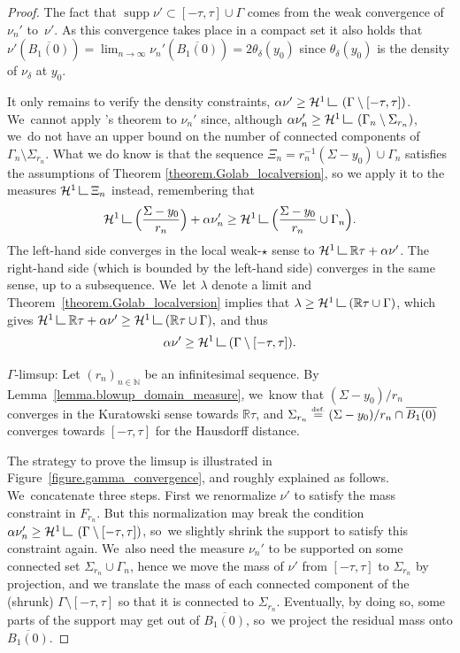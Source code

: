 \documentclass[JEP,XML,SOM,Unicode,NoFloatCountersInSection,published]{cedram}
\theoremstyle{definition}
\newcommand{\eqdef}{\ensuremath{\stackrel{\mbox{\upshape\tiny def.}}{=}}}
\newcommand\LM[1]{\hbox{\vrule width.5pt \vbox to#1pt{\vfill \hrule width#1pt height.5pt}}}
\newcommand\LL{{\mathchoice {\>\LM7\>}{\>\LM7\>}{\,\LM5\,}{\,\LM{3.35}\,}}}
\newcommand{\mres}{\LL}
\newcommand\cH{\mathcal{H}}
\newcommand{\RR}{\mathbb{R}}
\DeclareMathOperator{\supp}{supp}
\begin{document}
\begin{proof}
The fact that $\supp\nu' \subset [-\tau, \tau]\cup \Gamma$ comes from the weak convergence of~$\nu_{n}'$ to~$\nu'$. As this convergence takes place in a compact set it also holds that $\nu'(\overline{B_1(0)}) = \lim_{n \to \infty} \nu_{n}'(\overline{B_1(0)}) = 2\theta_\delta(y_0)$ since $\theta_\delta(y_0)$ is the density of $\nu_\delta$ at $y_0$.

It only remains to verify the density constraints, $\alpha \nu' \ge \mathcal{H}^1\mres \left(\Gamma\setminus [-\tau,\tau]\right)$. We~cannot apply \Golab's theorem to $\nu_n'$ since, although $\alpha\nu_n' \ge \cH^1\mres \left( \Gamma_n\setminus \Sigma_{r_n}\right)$, we~do not have an upper bound on the number of connected components of $\Gamma_n\setminus \Sigma_{r_n}$. What we do know is that the sequence $\Xi_n = r_n^{-1}(\Sigma - y_0) \cup \Gamma_n$ satisfies the assumptions of Theorem \ref{theorem.Golab_localversion},
so we apply it to the measures $\cH^1\mres\Xi_n$ instead, remembering that
\begin{equation*}
\mathcal{H}^1\mres
\Bigl(
\frac{\Sigma - y_0}{r_n}
\Bigr)
+
\alpha\nu_n'
\ge
\mathcal{H}^1\mres
\Bigl(
\frac{\Sigma - y_0}{r_n}\cup\Gamma_n
\Bigl).
\end{equation*}
The left-hand side converges in the local weak-$\star$ sense to
$\cH^1\mres \RR\tau + \alpha\nu'$. The right-hand side
(which is bounded by the left-hand side)
converges in the same sense, up to a subsequence. We~let
$\lambda$ denote a limit and Theorem~\ref{theorem.Golab_localversion} implies that $\lambda \ge \cH^1\mres (\RR\tau\cup \Gamma)$, which gives
$
\cH^1\mres \RR\tau + \alpha\nu' \ge \cH^1\mres (\RR\tau\cup \Gamma),
$
and thus
\[
\alpha\nu' \ge \cH^1\mres(\Gamma\setminus [-\tau,\tau]).
\]

\par $\Gamma$-limsup: Let $(r_{n})_{n\in\mathbb{N}}$ be an infinitesimal sequence. By Lemma~\ref{lemma.blowup_domain_measure}, we~know that $(\Sigma-y_0)/r_{n}$ converges in the Kuratowski sense towards $\RR\tau$, and $\Sigma_{r_n}\eqdef (\Sigma-\nobreak y_0)/r_{n}\cap\nobreak\overline{B_1(0)}$ converges towards $[-\tau,\tau]$ for the Hausdorff distance.

The strategy to prove the limsup is illustrated in Figure~\ref{figure.gamma_convergence},
and roughly explained as follows. We~concatenate three steps. First we renormalize $\nu'$ to satisfy the mass constraint in $F_{r_{n}}$. But this normalization may break the condition $\alpha \nu_n'\ge \cH^1\mres \left(\Gamma\setminus [-\tau,\tau]\right)$, so~we slightly shrink the support to satisfy this constraint again. We~also need the measure $\nu_{n}'$ to be supported on some connected set $\Sigma_{r_{n}}\cup \Gamma_{n}$, hence we move the mass of $\nu'$ from $[-\tau,\tau]$ to $\Sigma_{r_n}$ by projection, and we translate the mass of each connected component of the (shrunk) $\Gamma\setminus [-\tau,\tau]$ so that it is connected to $\Sigma_{r_n}$. Eventually, by doing so, some parts of the support may get out of $\overline{B_1(0)}$, so~we project the residual mass onto $\overline{B_1(0)}$.


\end{proof}
\end{document}
